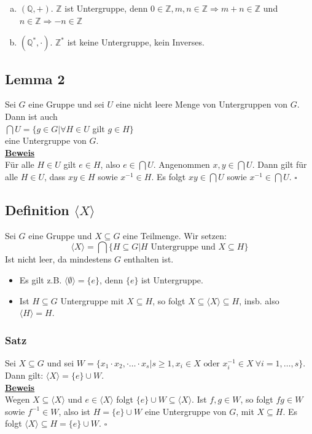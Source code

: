 \documentclass[a4paper, pagesize=pdftex, pdftex, twoside, headsepline, index=totoc,toc=listof, fontsize=10pt, cleardoublepage=empty, headinclude, DIV=13, BCOR=13mm]{scrartcl}
\newcommand{\bet}[1]{\uline{\textbf{#1}}} %
\newcommand{\lh}[1]{\langle #1 \rangle} %
\begin{document}
\begin{enumerate}[(a)]
	\item $(\mathds{Q}, +)$. $\mathds{Z}$  ist Untergruppe, denn $0 \in \mathds{Z}, m,n \in \mathds{Z} \Rightarrow m+n\in \mathds{Z}$ und $n\in \mathds{Z} \Rightarrow -n\in \mathds{Z}$
	\item $(\mathds{Q}^*,\cdot)$. $\mathds{Z}^*$ ist keine Untergruppe, kein Inverses.
\end{enumerate}

\subsection{Lemma 2}
\label{sub:lemma_2}
Sei $G$ eine Gruppe und sei $U$ eine nicht leere Menge von Untergruppen von $G$. Dann ist auch\\
$\bigcap U = \{g\in G | \forall H\in U$ gilt $g\in H\}$\\
eine Untergruppe von $G$.\\
\bet{Beweis}\\
Für alle $H\in U$ gilt $e\in H$, also $e\in \bigcap U$. Angenommen $x,y\in \bigcap U$. Dann gilt für alle $H\in U$, dass $xy\in H$ sowie $x^{-1}\in H$. Es folgt $xy\in \bigcap U$ sowie $x^{-1}\in \bigcap U$.
\hfill $\square$

\subsection{Definition $\lh{X}$}
\label{sub:def_lhX}
Sei $G$ eine Gruppe und $X \subseteq G$ eine Teilmenge. Wir setzen:
\[\lh{X}=\bigcap\{H\subseteq G | H \text{ Untergruppe und } X \subseteq H\}\]
Ist nicht leer, da mindestens $G$ enthalten ist.
\begin{itemize}
	\item Es gilt z.B. $\lh{\emptyset}=\{e\}$, denn $\{e\}$ ist Untergruppe.
	\item Ist $H \subseteq G$ Untergruppe mit $X \subseteq H$, so folgt $X\subseteq \lh{X} \subseteq H$, insb. also $\lh{H}=H$.
\end{itemize}

\subsubsection*{Satz}
Sei $X \subseteq G$ und sei $W=\{x_1\cdot x_2,\cdot \dots \cdot x_s | s\ge 1, x_i\in X \text{ oder } x_i^{-1}\in X ~\forall i=1,\dots,s\}$.\\
Dann gilt: $ \lh{X}=\{e\}\cup W$.\\
\bet{Beweis}\\
Wegen $X\subseteq \lh{X}$ und $e\in \lh{X}$ folgt $\{e\}\cup W\subseteq \lh{X}$. Ist $f,g\in W$, so folgt $fg\in W$ sowie $f^{-1}\in W$, also ist $H=\{e\}\cup W$ eine Untergruppe von $G$, mit $X\subseteq H$. Es folgt $\lh{X}\subseteq H=\{e\}\cup W$.
\hfill $\square$
\end{document}
